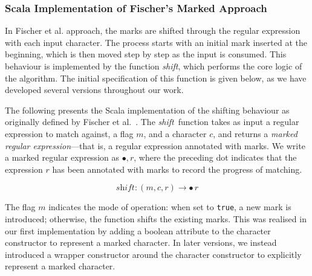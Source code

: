 \documentclass[12pt]{article}
\newcommand{\shift}{\textit{shift}}
\newcommand{\Marked}[1]{\bullet\,#1}
\begin{document}
\subsubsection{Scala Implementation of Fischer’s Marked Approach}

In Fischer et al. approach, the marks are shifted through the regular expression with each input character. 
The process starts with an initial mark inserted at the beginning, which is then moved step by step as the input is consumed. 
This behaviour is implemented by the function \shift, which performs the core logic of the algorithm. 
The initial specification of this function is given below, as we have developed several versions throughout our work.

The following presents the Scala implementation of the shifting behaviour as originally defined by Fischer et al.~\cite{Fischer2010}.
The \shift\ function takes as input a regular expression to match against, a flag $m$, and a character $c$, and returns a \emph{marked
regular expression}—that is, a regular expression annotated with marks. We write a marked regular expression as $\bullet,r$, where the 
preceding dot indicates that the expression $r$ has been annotated with marks to record the progress of matching.

\[ \shift : (m, c, r) \to \Marked{r}\]

The flag $m$ indicates the mode of operation: when set to \texttt{true}, a new mark is introduced; otherwise, the function shifts the existing marks.  
This was realised in our first implementation by adding a boolean attribute to the character constructor to represent a marked character.  
In later versions, we instead introduced a wrapper constructor around the character constructor to explicitly represent a marked character.
\end{document}
